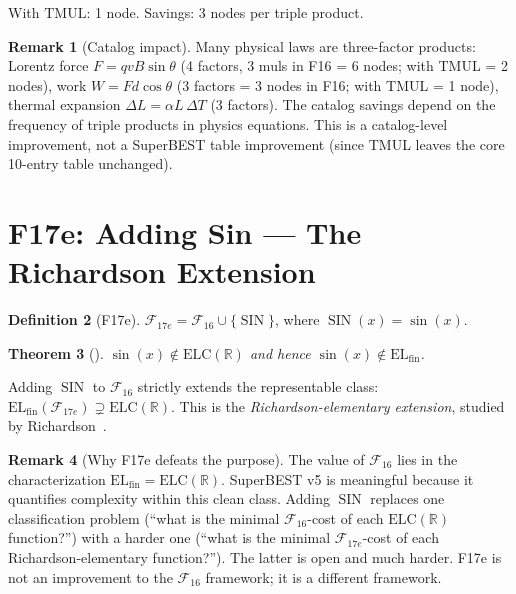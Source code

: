 \documentclass[12pt,a4paper]{article}
\newtheorem{theorem}{Theorem}[section]
\theoremstyle{definition}
\newtheorem{definition}[theorem]{Definition}
\newtheorem{remark}[theorem]{Remark}
\theoremstyle{remark}
\newcommand{\SIN}{\operatorname{SIN}}
\newcommand{\F}{\mathcal{F}_{16}}
\newcommand{\ELC}{\mathrm{ELC}(\mathbb{R})}
\newcommand{\ELfin}{\mathrm{EL}_{\mathrm{fin}}}
\begin{document}
With $\mathrm{TMUL}$: 1 node.  Savings: 3 nodes per triple product.

\begin{remark}[Catalog impact]
Many physical laws are three-factor products:
Lorentz force $F = qvB\sin\theta$ (4 factors, 3 muls in F16 = 6 nodes;
with TMUL = 2 nodes),
work $W = Fd\cos\theta$ (3 factors = 3 nodes in F16; with TMUL = 1 node),
thermal expansion $\Delta L = \alpha L\,\Delta T$ (3 factors).
The catalog savings depend on the frequency of triple products in physics equations.
This is a catalog-level improvement, not a SuperBEST table improvement
(since TMUL leaves the core 10-entry table unchanged).
\end{remark}

\section{F17e: Adding Sin --- The Richardson Extension}
\label{sec:sin}

\begin{definition}[F17e]
$\mathcal{F}_{17e} = \F \cup \{\SIN\}$, where $\SIN(x) = \sin(x)$.
\end{definition}

\begin{theorem}[\cite{F16Char}]
$\sin(x)\notin\ELC$ and hence $\sin(x)\notin\ELfin$.
\end{theorem}

Adding $\SIN$ to $\F$ strictly extends the representable class:
$\ELfin(\mathcal{F}_{17e}) \supsetneq \ELC$.
This is the \emph{Richardson-elementary extension}, studied by
Richardson~\cite{Richardson1968}.

\begin{remark}[Why F17e defeats the purpose]
The value of $\F$ lies in the characterization $\ELfin = \ELC$.
SuperBEST v5 is meaningful because it quantifies complexity within this
clean class.  Adding $\SIN$ replaces one classification problem (``what
is the minimal $\F$-cost of each $\ELC$ function?'') with a harder one
(``what is the minimal $\mathcal{F}_{17e}$-cost of each Richardson-elementary
function?'').  The latter is open and much harder.
F17e is not an improvement to the $\F$ framework; it is a different framework.
\end{remark}

\end{document}
